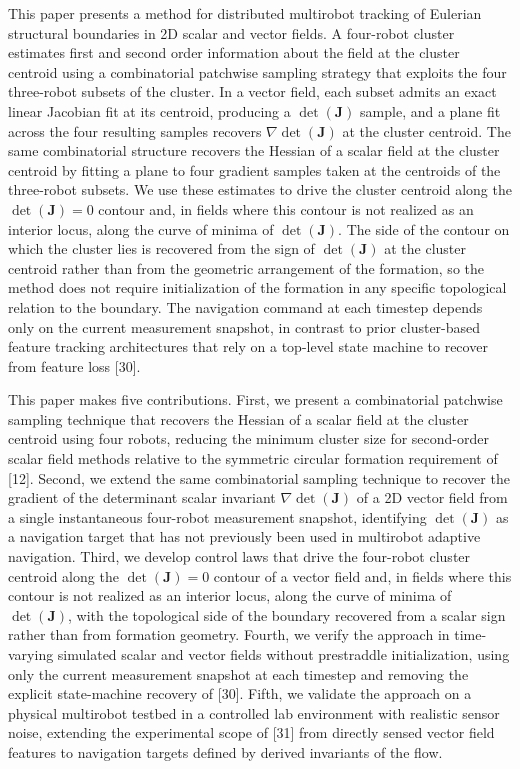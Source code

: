 \documentclass[lettersize,journal]{IEEEtran}
\begin{document}
This paper presents a method for distributed multirobot tracking of Eulerian structural boundaries in 2D scalar and vector fields. A four-robot cluster estimates first and second order information about the field at the cluster centroid using a combinatorial patchwise sampling strategy that exploits the four three-robot subsets of the cluster. In a vector field, each subset admits an exact linear Jacobian fit at its centroid, producing a $\det(\mathbf{J})$ sample, and a plane fit across the four resulting samples recovers $\nabla \det(\mathbf{J})$ at the cluster centroid. The same combinatorial structure recovers the Hessian of a scalar field at the cluster centroid by fitting a plane to four gradient samples taken at the centroids of the three-robot subsets. We use these estimates to drive the cluster centroid along the $\det(\mathbf{J}) = 0$ contour and, in fields where this contour is not realized as an interior locus, along the curve of minima of $\det(\mathbf{J})$. The side of the contour on which the cluster lies is recovered from the sign of $\det(\mathbf{J})$ at the cluster centroid rather than from the geometric arrangement of the formation, so the method does not require initialization of the formation in any specific topological relation to the boundary. The navigation command at each timestep depends only on the current measurement snapshot, in contrast to prior cluster-based feature tracking architectures that rely on a top-level state machine to recover from feature loss [30].

This paper makes five contributions. First, we present a combinatorial patchwise sampling technique that recovers the Hessian of a scalar field at the cluster centroid using four robots, reducing the minimum cluster size for second-order scalar field methods relative to the symmetric circular formation requirement of [12]. Second, we extend the same combinatorial sampling technique to recover the gradient of the determinant scalar invariant $\nabla \det(\mathbf{J})$ of a 2D vector field from a single instantaneous four-robot measurement snapshot, identifying $\det(\mathbf{J})$ as a navigation target that has not previously been used in multirobot adaptive navigation. Third, we develop control laws that drive the four-robot cluster centroid along the $\det(\mathbf{J}) = 0$ contour of a vector field and, in fields where this contour is not realized as an interior locus, along the curve of minima of $\det(\mathbf{J})$, with the topological side of the boundary recovered from a scalar sign rather than from formation geometry. Fourth, we verify the approach in time-varying simulated scalar and vector fields without prestraddle initialization, using only the current measurement snapshot at each timestep and removing the explicit state-machine recovery of [30]. Fifth, we validate the approach on a physical multirobot testbed in a controlled lab environment with realistic sensor noise, extending the experimental scope of [31] from directly sensed vector field features to navigation targets defined by derived invariants of the flow.
\end{document}
